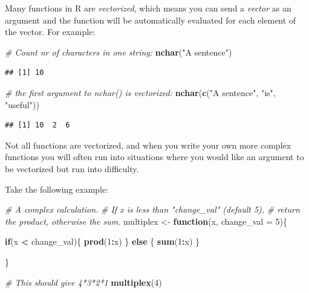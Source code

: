 \documentclass[]{book}
\newenvironment{Shaded}{\begin{snugshade}}{\end{snugshade}}
\newcommand{\CommentTok}[1]{\textcolor[rgb]{0.56,0.35,0.01}{\textit{#1}}}
\newcommand{\ControlFlowTok}[1]{\textcolor[rgb]{0.13,0.29,0.53}{\textbf{#1}}}
\newcommand{\DataTypeTok}[1]{\textcolor[rgb]{0.13,0.29,0.53}{#1}}
\newcommand{\DecValTok}[1]{\textcolor[rgb]{0.00,0.00,0.81}{#1}}
\newcommand{\KeywordTok}[1]{\textcolor[rgb]{0.13,0.29,0.53}{\textbf{#1}}}
\newcommand{\NormalTok}[1]{#1}
\newcommand{\OperatorTok}[1]{\textcolor[rgb]{0.81,0.36,0.00}{\textbf{#1}}}
\newcommand{\StringTok}[1]{\textcolor[rgb]{0.31,0.60,0.02}{#1}}
\begin{document}
Many functions in R are \emph{vectorized}, which means you can send a \emph{vector} as an argument and the function will be automatically evaluated for each element of the vector. For example:

\begin{Shaded}
\begin{Highlighting}[]
\CommentTok{# Count nr of characters in one string:}
\KeywordTok{nchar}\NormalTok{(}\StringTok{"A sentence"}\NormalTok{)}
\end{Highlighting}
\end{Shaded}

\begin{verbatim}
## [1] 10
\end{verbatim}

\begin{Shaded}
\begin{Highlighting}[]
\CommentTok{# the first argument to nchar() is vectorized:}
\KeywordTok{nchar}\NormalTok{(}\KeywordTok{c}\NormalTok{(}\StringTok{"A sentence"}\NormalTok{, }\StringTok{"is"}\NormalTok{, }\StringTok{"useful"}\NormalTok{))}
\end{Highlighting}
\end{Shaded}

\begin{verbatim}
## [1] 10  2  6
\end{verbatim}

Not all functions are vectorized, and when you write your own more complex functions you will often run into situations where you would like an argument to be vectorized but run into difficulty.

Take the following example:

\begin{Shaded}
\begin{Highlighting}[]
\CommentTok{# A complex calculation. }
\CommentTok{# If x is less than "change_val" (default 5), }
\CommentTok{# return the product, otherwise the sum.}
\NormalTok{multiplex <-}\StringTok{ }\ControlFlowTok{function}\NormalTok{(x, }\DataTypeTok{change_val =} \DecValTok{5}\NormalTok{)\{}
  
  \ControlFlowTok{if}\NormalTok{(x }\OperatorTok{<}\StringTok{ }\NormalTok{change_val)\{}
    \KeywordTok{prod}\NormalTok{(}\DecValTok{1}\OperatorTok{:}\NormalTok{x)}
\NormalTok{  \} }\ControlFlowTok{else}\NormalTok{ \{}
    \KeywordTok{sum}\NormalTok{(}\DecValTok{1}\OperatorTok{:}\NormalTok{x)}
\NormalTok{  \}}
  
\NormalTok{\}}

\CommentTok{# This should give 4*3*2*1}
\KeywordTok{multiplex}\NormalTok{(}\DecValTok{4}\NormalTok{)}
\end{Highlighting}
\end{Shaded}
\end{document}

